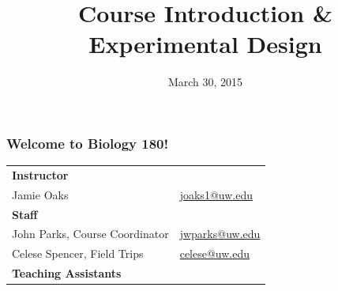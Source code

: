 


% 



\title[Intro \& Experimental Design]{Course Introduction \& Experimental Design}
\date{March 30, 2015}



\begin{noheadline}
\maketitle
\end{noheadline}


\begin{noheadline}
\begin{frame}
\frametitle{Welcome to Biology 180!}

    \begin{table}%
        \centering
        \begin{tabular}{ l l }
            \textbf{Instructor} & \\
            Jamie Oaks & \href{mailto:joaks1@uw.edu}{joaks1@uw.edu} \\[1.5ex]
            \textbf{Staff} & \\
            John Parks, Course Coordinator & \href{mailto:jwparks@uw.edu}{jwparks@uw.edu} \\
            Celese Spencer, Field Trips & \href{mailto:celese@uw.edu}{celese@uw.edu} \\[1.5ex]
            \textbf{Teaching Assistants} \\
        \end{tabular}
    \end{table}

\end{frame}
\end{noheadline}

